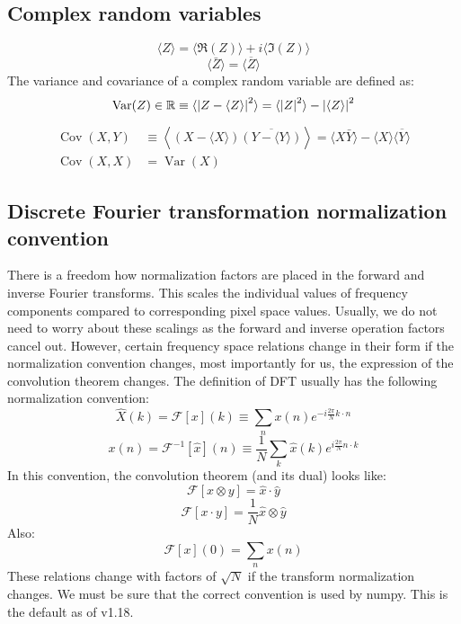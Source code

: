 \documentclass[11pt]{article}
\begin{document}
\subsection{Complex random variables}
%
\begin{equation}
\langle Z\rangle = \langle\Re(Z)\rangle + i\langle\Im(Z)\rangle
\end{equation}
%
\begin{equation}
\langle \bar{Z}\rangle = \overline{\langle Z\rangle}
\end{equation}
%
\newcommand{\Var}{\mathrm{Var}}
%
The variance and covariance of a complex random variable are defined as:
\begin{equation}
\operatorname{Var}(Z) \in \mathbb{R} \equiv \langle\abs{Z-\langle Z \rangle}^2 \rangle =
\langle\abs{Z}^2\rangle - \abs{\langle Z \rangle}^2
\end{equation}
%
\begin{align}
\operatorname{Cov}(X, Y) &\equiv \left\langle\left(X - \langle X \rangle\right)
\overline{\left(Y - \langle Y \rangle\right)} \right\rangle
= \langle X\bar{Y} \rangle - \langle X \rangle \overline{\langle Y \rangle} \\
\operatorname{Cov}(X, X) &= \operatorname{Var}(X)
\end{align}
%
\subsection{Discrete Fourier transformation normalization convention}
\par There is a freedom how normalization factors are placed in the
forward and inverse Fourier transforms.  This scales the individual
values of frequency components compared to corresponding pixel space
values. Usually, we do not need to worry about these scalings as the
forward and inverse operation factors cancel out. However, certain
frequency space relations change in their form if the normalization
convention changes, most importantly for us, the expression of the
convolution theorem changes.
%
The definition of DFT usually has the following normalization convention:
\begin{equation}
\hat{X}(k) = \mathcal{F}[x](k) \equiv \sum_n x(n) e^{-i\frac{2\pi}{N}k\cdot n}
\end{equation}
%
\begin{equation}
x(n) = \mathcal{F}^{-1}[\hat{x}](n) \equiv \frac{1}{N}\sum_k \hat{x}(k)
  e^{i\frac{2\pi}{N}n\cdot k}
\end{equation}
In this convention, the convolution theorem (and its dual) looks like:
\begin{equation}
\mathcal{F}[x \otimes y] =  \hat{x} \cdot \hat{y}
\end{equation}
\begin{equation}
\mathcal{F}[x\cdot y] = \frac{1}{N} \hat{x} \otimes \hat{y}
\end{equation}
Also:
\begin{equation}
\mathcal{F}[x](0) = \sum_n x(n)
\label{eq:X0sum}
\end{equation}
These relations change with factors of $\sqrt{N}$ if the transform
normalization changes. We must be sure that the correct convention is used
by numpy. This is the default as of v1.18.
%
\end{document}
